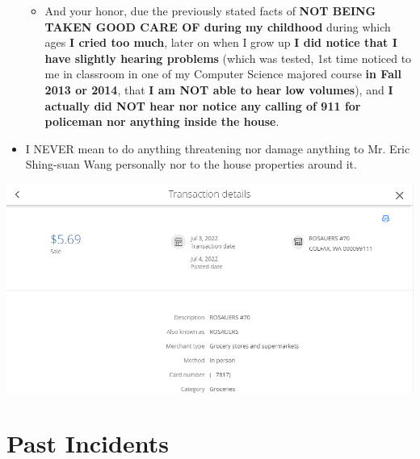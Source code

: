 \documentclass[9pt, b5paper]{article}
\begin{document}
\begin{itemize}
\begin{itemize}
\item And your honor, due the previously stated facts of \textbf{NOT BEING TAKEN GOOD CARE OF during my childhood} during which ages \textbf{I cried too much}, later on when I grow up \textbf{I did notice that I have slightly hearing problems} (which was tested, 1st time noticed to me in classroom in one of my Computer Science majored course \textbf{in Fall 2013 or 2014}, that \textbf{I am NOT able to hear low volumes}), and \textbf{I actually did NOT hear nor notice any calling of 911 for policeman nor anything inside the house}.
\end{itemize}
\item I NEVER mean to do anything threatening nor damage anything to Mr. Eric Shing-suan Wang personally nor to the house properties around it.
\end{itemize}

\includegraphics[width=.9\linewidth]{./pic/dearCousin_20220919_201117.png}
\section{Past Incidents}
\label{sec-5}
\end{document}
